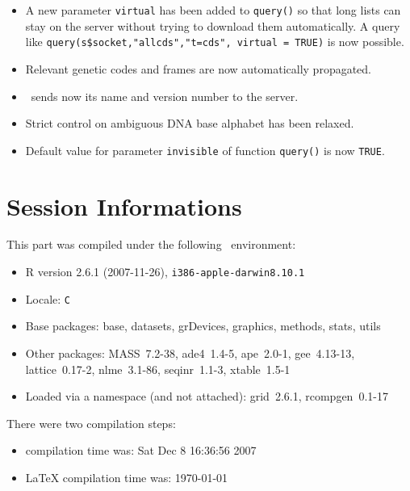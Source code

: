 \documentclass{article}
\begin{document}
\begin{itemize}
\item A new parameter \texttt{virtual} has been added to \texttt{query()} 
so that long lists can stay on the server without trying to download
them automatically. A query like \texttt{query(s\$socket,"allcds","t=cds", virtual = TRUE)} is 
now possible.

\item Relevant genetic codes and frames are now automatically propagated.

\item \Seqinr{}~sends now its name and version number to the server.

\item Strict control on ambiguous DNA base alphabet has been relaxed.

\item Default value for parameter \texttt{invisible} of function \texttt{query()} is now \texttt{TRUE}.

\end{itemize}



\section*{Session Informations}

This part was compiled under the following \Rlogo{}~environment:

\begin{itemize}
  \item R version 2.6.1 (2007-11-26), \verb|i386-apple-darwin8.10.1|
  \item Locale: \verb|C|
  \item Base packages: base, datasets, grDevices, graphics, methods,
    stats, utils
  \item Other packages: MASS~7.2-38, ade4~1.4-5, ape~2.0-1,
    gee~4.13-13, lattice~0.17-2, nlme~3.1-86, seqinr~1.1-3,
    xtable~1.5-1
  \item Loaded via a namespace (and not attached): grid~2.6.1,
    rcompgen~0.1-17
\end{itemize}
There were two compilation steps:

\begin{itemize}
  \item \Rlogo{} compilation time was: Sat Dec  8 16:36:56 2007
  \item \LaTeX{} compilation time was: \today
\end{itemize}



\clearpage
{}


\end{document}
